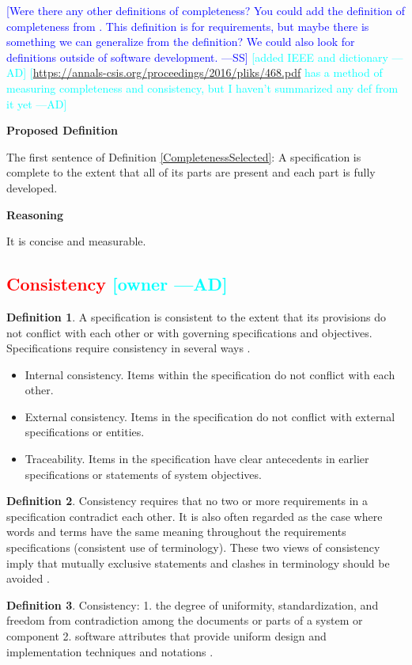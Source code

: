 \documentclass[letterpaper,cleveref]{lipics-v2019}
\newcommand{\authornote}[3]{\textcolor{#1}{[#3 ---#2]}}
\newcommand{\authornote}[3]{}
\newcommand{\wss}[1]{\authornote{blue}{SS}{#1}} %
\newcommand{\ad}[1]{\authornote{cyan}{AD}{#1}} %
\newcommand{\notdone}[1]{\textcolor{red}{#1}}
\theoremstyle{definition}
\newtheorem{defn}{Definition}
\begin{document}
\wss{Were there any other definitions of completeness?  You could add the
	definition of completeness from \citet[p.\ 5--6]{IEEE1998}.  This definition
	is for
	requirements, but maybe there is something we can generalize from the
	definition?  We could also look for definitions outside of software
	development.}
\ad{added IEEE and dictionary}
\ad{\url{https://annals-csis.org/proceedings/2016/pliks/468.pdf} has a method of
measuring completeness and consistency, but I haven't summarized any def from it
yet}

\noindent \textbf{Proposed Definition} 

The first sentence of Definition \ref{CompletenessSelected}: A specification is
complete to the extent that all of its parts are present and each part is fully
developed.

\noindent \textbf{Reasoning}

It is concise and measurable.

\subsection{\notdone{Consistency} \ad{owner}}

\begin{defn}
  \label{ConsistencySelected}
  A specification is consistent to the extent that its provisions do not
  conflict with each other or with governing specifications and
  objectives. Specifications require consistency in several ways
  \citep{Boehm1984}.
  \begin{itemize}
  \item Internal consistency. Items within the specification do not conflict
    with each other.
  \item External consistency. Items in the specification do not conflict with
    external specifications or entities.
  \item Traceability. Items in the specification have clear antecedents in
    earlier specifications or statements of system objectives.
  \end{itemize}
\end{defn}

\begin{defn}
  Consistency requires that no two or more requirements in a specification
  contradict each other. It is also often regarded as the case where words and
  terms have the same meaning throughout the requirements specifications
  (consistent use of terminology). These two views of consistency imply that
  mutually exclusive statements and clashes in terminology should be avoided
  \citep{ZOWGHI2003}.
\end{defn}
\begin{defn}
  Consistency: 1. the degree of uniformity, standardization, and freedom from
  contradiction among the documents or parts of a system or component
  2. software attributes that provide uniform design and implementation
  techniques and notations \citep{ISO/IEC/IEEE24765}.
\end{defn}
\end{document}
